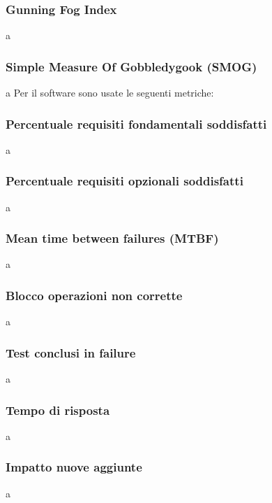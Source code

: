 		\subsubsection{Gunning Fog Index} a\newline
		\subsubsection{Simple Measure Of Gobbledygook (SMOG)} a\newline \newline
		Per il software sono usate le seguenti metriche:\newline
		\subsubsection{Percentuale requisiti fondamentali soddisfatti} a\newline
		\subsubsection{Percentuale requisiti opzionali soddisfatti} a\newline
		\subsubsection{Mean time between failures (MTBF)} a\newline
		\subsubsection{Blocco operazioni non corrette} a\newline
		\subsubsection{Test conclusi in failure} a\newline
		\subsubsection{Tempo di risposta} a\newline
		\subsubsection{Impatto nuove aggiunte} a\newline